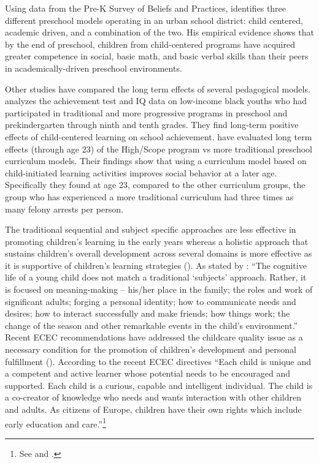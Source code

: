 \documentclass[12pt]{article}
\begin{document}
Using data from the Pre-K Survey of Beliefs and Practices, \cite{Marcon1999} identifies three different preschool models operating in an urban school district: child centered, academic driven, and a combination of the two. His empirical evidence shows that by the end of preschool, children from child-centered programs have acquired greater competence in social, basic math, and basic verbal skills than their peers in academically-driven preschool environments.

Other studies have compared the long term effects of several pedagogical models. \cite{Miller1984a} analyzes the achievement test and IQ data on low-income black youths who had participated in traditional and more progressive programs in preschool and prekindergarten through ninth and tenth grades. They find long-term positive effects of child-centered learning on school achievement. \cite{Schweinhart1997} have evaluated long term effects (through age 23) of the High/Scope program vs more traditional preschool curriculum models. Their findings show that using a curriculum model based on child-initiated learning activities improves social behavior at a later age. Specifically they found at age 23, compared to the other curriculum groups, the group who has experienced a more traditional curriculum had three times as many felony arrests per person.

The traditional sequential and subject specific approaches are less effective in promoting children's learning in the early years whereas a holistic approach that sustains children's overall development across several domains is more effective as it is supportive of children's learning strategies (\cite{Bennett2012}). As stated by \cite{Bennett2013}: ``The cognitive life of a young child does not match a traditional `subjects' approach. Rather, it is focused on meaning-making -- his/her place in the family; the roles and work of significant adults; forging a personal identity; how to communicate needs and desires; how to interact successfully and make friends; how things work; the change of the season and other remarkable events in the child's environment.'' Recent ECEC recommendations have addressed the childcare quality issue as a necessary condition for the promotion of children's development and personal fulfillment (\cite{EuropeanCommission2011,Council2011}). According to the recent ECEC directives ``Each child is unique and a competent and active learner whose potential needs to be encouraged and supported. Each child is a curious, capable and intelligent individual. The child is a co-creator of knowledge who needs and wants interaction with other children and adults. As citizens of Europe, children have their own rights which include early education and care.''\footnote{See \cite{ChildrenInEurope2008} and \cite{Kickbusch2012}.}
\end{document}
